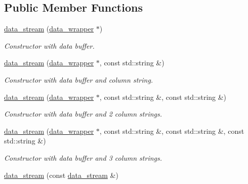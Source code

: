 \subsection*{Public Member Functions}
\begin{DoxyCompactItemize}
\item 
\hypertarget{a00115_ab75592c53569323eac9cf92b62ada9d2}{}\hyperlink{a00115_ab75592c53569323eac9cf92b62ada9d2}{data\+\_\+stream} (\hyperlink{a00116}{data\+\_\+wrapper} $\ast$)\label{a00115_ab75592c53569323eac9cf92b62ada9d2}

\begin{DoxyCompactList}\small\item\em Constructor with data buffer. \end{DoxyCompactList}\item 
\hypertarget{a00115_ac421009ddaaf089e6193c23747f93ed7}{}\hyperlink{a00115_ac421009ddaaf089e6193c23747f93ed7}{data\+\_\+stream} (\hyperlink{a00116}{data\+\_\+wrapper} $\ast$, const std\+::string \&)\label{a00115_ac421009ddaaf089e6193c23747f93ed7}

\begin{DoxyCompactList}\small\item\em Constructor with data buffer and column string. \end{DoxyCompactList}\item 
\hypertarget{a00115_aa76a5153380208b3a112689e20611a67}{}\hyperlink{a00115_aa76a5153380208b3a112689e20611a67}{data\+\_\+stream} (\hyperlink{a00116}{data\+\_\+wrapper} $\ast$, const std\+::string \&, const std\+::string \&)\label{a00115_aa76a5153380208b3a112689e20611a67}

\begin{DoxyCompactList}\small\item\em Constructor with data buffer and 2 column strings. \end{DoxyCompactList}\item 
\hypertarget{a00115_a8d83e622d90df4b96208dde7e49b52ad}{}\hyperlink{a00115_a8d83e622d90df4b96208dde7e49b52ad}{data\+\_\+stream} (\hyperlink{a00116}{data\+\_\+wrapper} $\ast$, const std\+::string \&, const std\+::string \&, const std\+::string \&)\label{a00115_a8d83e622d90df4b96208dde7e49b52ad}

\begin{DoxyCompactList}\small\item\em Constructor with data buffer and 3 column strings. \end{DoxyCompactList}\item 
\hypertarget{a00115_a1372f7f4582c3f38a39598da73ef10e3}{}\hyperlink{a00115_a1372f7f4582c3f38a39598da73ef10e3}{data\+\_\+stream} (const \hyperlink{a00115}{data\+\_\+stream} \&)\label{a00115_a1372f7f4582c3f38a39598da73ef10e3}


\end{DoxyCompactItemize}
